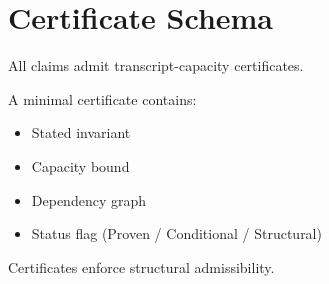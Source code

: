 \chapter{Certificate Schema}

All claims admit transcript-capacity certificates.

A minimal certificate contains:

\begin{itemize}
\item Stated invariant
\item Capacity bound
\item Dependency graph
\item Status flag (Proven / Conditional / Structural)
\end{itemize}

Certificates enforce structural admissibility.

